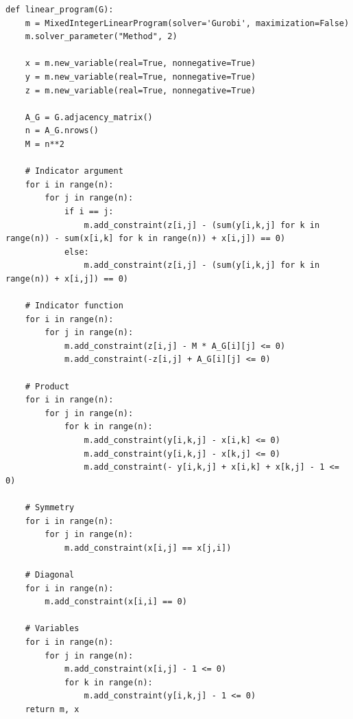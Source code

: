 \begin{lstlisting}[style=python, caption={Linear Program.}, label={lst::linear_program}]
def linear_program(G):
    m = MixedIntegerLinearProgram(solver='Gurobi', maximization=False)
    m.solver_parameter("Method", 2)

    x = m.new_variable(real=True, nonnegative=True)
    y = m.new_variable(real=True, nonnegative=True)
    z = m.new_variable(real=True, nonnegative=True)

    A_G = G.adjacency_matrix()
    n = A_G.nrows()
    M = n**2

    # Indicator argument
    for i in range(n):
        for j in range(n):
            if i == j:
                m.add_constraint(z[i,j] - (sum(y[i,k,j] for k in range(n)) - sum(x[i,k] for k in range(n)) + x[i,j]) == 0)
            else:
                m.add_constraint(z[i,j] - (sum(y[i,k,j] for k in range(n)) + x[i,j]) == 0)

    # Indicator function
    for i in range(n):
        for j in range(n):
            m.add_constraint(z[i,j] - M * A_G[i][j] <= 0)
            m.add_constraint(-z[i,j] + A_G[i][j] <= 0)

    # Product
    for i in range(n):
        for j in range(n):
            for k in range(n):
                m.add_constraint(y[i,k,j] - x[i,k] <= 0)
                m.add_constraint(y[i,k,j] - x[k,j] <= 0)
                m.add_constraint(- y[i,k,j] + x[i,k] + x[k,j] - 1 <= 0)

    # Symmetry
    for i in range(n):
        for j in range(n):
            m.add_constraint(x[i,j] == x[j,i])

    # Diagonal
    for i in range(n):
        m.add_constraint(x[i,i] == 0)

    # Variables
    for i in range(n):
        for j in range(n):
            m.add_constraint(x[i,j] - 1 <= 0)
            for k in range(n):
                m.add_constraint(y[i,k,j] - 1 <= 0)
    return m, x
\end{lstlisting}

